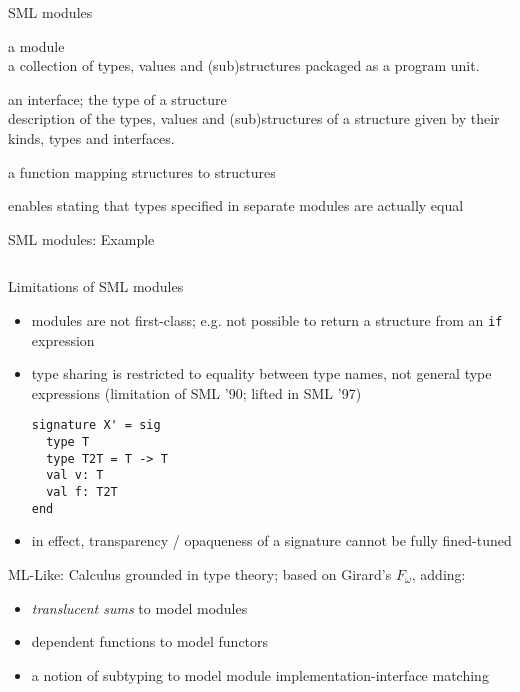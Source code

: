\documentclass{beamer}
\begin{document}
\begin{frame}{SML modules}
\begin{description}
\item[structure] a module\\a collection of types, values and
  (sub)structures packaged as a program unit.
\item[signature] an interface; the type of a structure\\description of
  the types, values and (sub)structures of a structure given by their
  kinds, types and interfaces.
\item[functor] a function mapping structures to structures
\item[type-sharing] enables stating that types specified in separate
  modules are actually equal
\end{description}
\end{frame}

\begin{frame}[fragile]{SML modules: Example}
\inputminted[fontsize=\footnotesize]{sml}{intro.sml}
\end{frame}

\begin{frame}[fragile]{Limitations of SML modules}
\begin{itemize}
\item modules are not first-class; e.g. not possible to return a
  structure from an {\tt if} expression
\item type sharing is restricted to equality between type names, not
  general type expressions (limitation of SML '90; lifted in SML '97)
\begin{verbatim}
signature X' = sig
  type T
  type T2T = T -> T
  val v: T
  val f: T2T
end
\end{verbatim}
\item in effect, transparency / opaqueness of a signature cannot be
  fully fined-tuned
\end{itemize}
\end{frame}

\begin{frame}{ML-Like: Calculus}
grounded in type theory; based on Girard's $F_\omega$, adding: %
\begin{itemize}
\item {\it translucent sums} to model modules
\item dependent functions to model functors
\item a notion of subtyping to model module implementation-interface matching
\end{itemize}
\end{frame}
\end{document}
